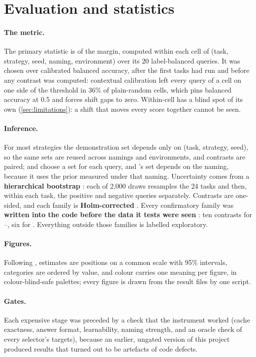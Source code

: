 \section{Evaluation and statistics}
\label{sec:stats}

\paragraph{The metric.}
The primary statistic is \AUROC \citep{hanley1982meaning,fawcett2006introduction} of the margin, computed within each cell of (task, strategy, seed, naming, environment) over its 20 label-balanced queries.
It was chosen over calibrated balanced accuracy, after the first tasks had run and before any contrast was computed: contextual calibration left every query of a cell on one side of the threshold in 36\% of plain-random cells, which pins balanced accuracy at 0.5 and forces shift gaps to zero.
Within-cell \AUROC has a blind spot of its own (\autoref{sec:limitations}): a shift that moves every score together cannot be seen.

\paragraph{Inference.}
For most strategies the demonstration set depends only on (task, strategy, seed), so the same sets are reused across namings and environments, and contrasts are paired;  and \sata choose a set for each query, and 's set depends on the naming, because it uses the prior measured under that naming.
Uncertainty comes from a \textbf{hierarchical bootstrap} \citep{efron1993introduction,davison1997bootstrap}: each of 2,000 draws resamples the 24 tasks and then, within each task, the positive and negative queries separately.
Contrasts are one-sided, and each family is \textbf{Holm-corrected} \citep{holm1979simple}.
Every confirmatory family was \textbf{written into the code before the data it tests were seen} \citep{nosek2018preregistration}: ten contrasts for --, six for \sata.
Everything outside those families is labelled exploratory.

\paragraph{Figures.}
Following \citet{healy2019data}, estimates are positions on a common scale with 95\% intervals, categories are ordered by value, and colour carries one meaning per figure, in colour-blind-safe palettes; every figure is drawn from the result files by one script.

\paragraph{Gates.}
Each expensive stage was preceded by a check that the instrument worked (cache exactness, answer format, learnability, naming strength, and an oracle check of every selector's targets), because an earlier, ungated version of this project produced results that turned out to be artefacts of code defects.
